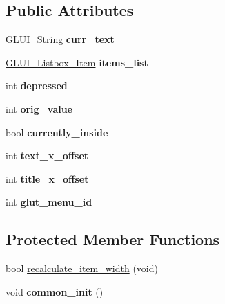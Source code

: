 \subsection*{Public Attributes}
\begin{DoxyCompactItemize}
\item 
\hypertarget{classGLUI__Listbox_a914b9f8f231fe92b507ec64fbe209271}{G\-L\-U\-I\-\_\-\-String {\bfseries curr\-\_\-text}}\label{classGLUI__Listbox_a914b9f8f231fe92b507ec64fbe209271}

\item 
\hypertarget{classGLUI__Listbox_a1c6c9d72bdb2c2197ecbe99091534f87}{\hyperlink{classGLUI__Listbox__Item}{G\-L\-U\-I\-\_\-\-Listbox\-\_\-\-Item} {\bfseries items\-\_\-list}}\label{classGLUI__Listbox_a1c6c9d72bdb2c2197ecbe99091534f87}

\item 
\hypertarget{classGLUI__Listbox_a1e00ed51f0b6c8d7e82e8974889a40e7}{int {\bfseries depressed}}\label{classGLUI__Listbox_a1e00ed51f0b6c8d7e82e8974889a40e7}

\item 
\hypertarget{classGLUI__Listbox_a5ee58581ac1506984e30868cc8a8c1ec}{int {\bfseries orig\-\_\-value}}\label{classGLUI__Listbox_a5ee58581ac1506984e30868cc8a8c1ec}

\item 
\hypertarget{classGLUI__Listbox_a5710debcc1604913c926f65db2019b56}{bool {\bfseries currently\-\_\-inside}}\label{classGLUI__Listbox_a5710debcc1604913c926f65db2019b56}

\item 
\hypertarget{classGLUI__Listbox_a0f40668bfe80f3fce9c0e027f9e52701}{int {\bfseries text\-\_\-x\-\_\-offset}}\label{classGLUI__Listbox_a0f40668bfe80f3fce9c0e027f9e52701}

\item 
\hypertarget{classGLUI__Listbox_a4bc9d6c3e849e840b0f61eb446ecba95}{int {\bfseries title\-\_\-x\-\_\-offset}}\label{classGLUI__Listbox_a4bc9d6c3e849e840b0f61eb446ecba95}

\item 
\hypertarget{classGLUI__Listbox_a6efefff573e3d8a77454c94b2aec15c7}{int {\bfseries glut\-\_\-menu\-\_\-id}}\label{classGLUI__Listbox_a6efefff573e3d8a77454c94b2aec15c7}

\end{DoxyCompactItemize}
\subsection*{Protected Member Functions}
\begin{DoxyCompactItemize}
\item 
bool \hyperlink{classGLUI__Listbox_a2d7f6743dea0483354ba495eedfd7d5e}{recalculate\-\_\-item\-\_\-width} (void)
\item 
\hypertarget{classGLUI__Listbox_aab5847ab5aa4011667334e9dfb6a5c67}{void {\bfseries common\-\_\-init} ()}\label{classGLUI__Listbox_aab5847ab5aa4011667334e9dfb6a5c67}

\end{DoxyCompactItemize}
